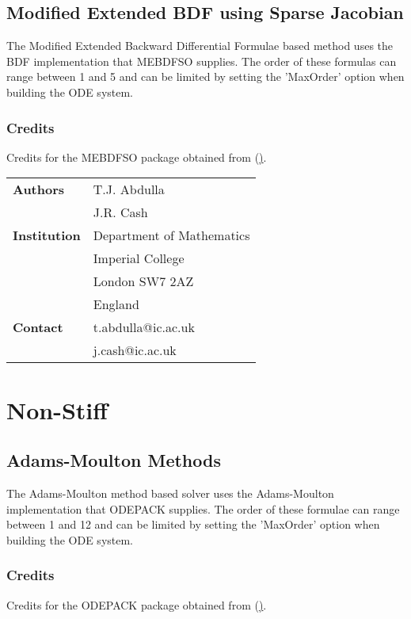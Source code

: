 \subsection{Modified Extended BDF using Sparse Jacobian}
\label{subsec:MEBDFSO}
The Modified Extended Backward Differential Formulae based method uses the BDF implementation that MEBDFSO supplies. The order of these formulas can range between 1 and 5 and can be limited by setting the 'MaxOrder' option when building the ODE system.

\subsubsection{Credits}
Credits for the MEBDFSO package obtained from (\hyperlink{http://www.netlib.org/}).

\vspace{0.5cm}
\begin{tabular}{ l l }
 \textbf{Authors}     & T.J. Abdulla \\
                      & J.R. Cash \\
 \textbf{Institution} & Department of Mathematics \\
                      & Imperial College \\
                      & London SW7 2AZ \\
                      & England \\
 \textbf{Contact}     & t.abdulla@ic.ac.uk \\
                      & j.cash@ic.ac.uk \\
\end{tabular}

\section{Non-Stiff}
\subsection{Adams-Moulton Methods}
\label{subsec:LSODEAM}
The Adams-Moulton method based solver uses the Adams-Moulton implementation that ODEPACK supplies. The order of these formulae can range between 1 and 12 and can be limited by setting the 'MaxOrder' option when building the ODE system.
\subsubsection{Credits}
Credits for the ODEPACK package obtained from (\hyperlink{http://www.netlib.org/}).

